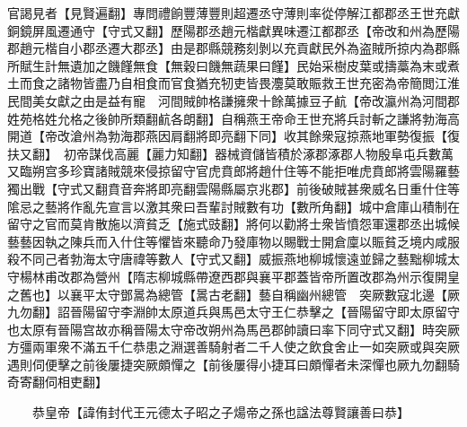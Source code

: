 官謁見者【見賢遍翻】專問禮餉豐薄豐則超遷丞守薄則率從停解江都郡丞王世充獻銅鏡屏風遷通守【守式又翻】歷陽郡丞趙元楷獻異味遷江都郡丞【帝改和州為歷陽郡趙元楷自小郡丞遷大郡丞】由是郡縣競務刻剝以充貢獻民外為盗賊所掠内為郡縣所賦生計無遺加之饑饉無食【無穀曰饑無蔬果曰饉】民始采樹皮葉或擣藁為末或煮土而食之諸物皆盡乃自相食而官食猶充牣吏皆畏灋莫敢賑救王世充密為帝簡閲江淮民間美女獻之由是益有寵　河間賊帥格謙擁衆十餘萬據豆子䴚【帝改瀛州為河間郡姓苑格姓允格之後帥所類翻䴚各朗翻】自稱燕王帝命王世充將兵討斬之謙將勃海高開道【帝改滄州為勃海郡燕因肩翻將即亮翻下同】收其餘衆寇掠燕地軍勢復振【復扶又翻】　初帝謀伐高麗【麗力知翻】器械資儲皆積於涿郡涿郡人物殷阜屯兵數萬又臨朔宫多珍寶諸賊競來侵掠留守官虎賁郎將趙什住等不能拒唯虎賁郎將雲陽羅藝獨出戰【守式又翻賁音奔將即亮翻雲陽縣屬京兆郡】前後破賊甚衆威名日重什住等隂忌之藝將作亂先宣言以激其衆曰吾輩討賊數有功【數所角翻】城中倉庫山積制在留守之官而莫肯散施以濟貧乏【施式豉翻】將何以勸將士衆皆憤怨軍還郡丞出城候藝藝因執之陳兵而入什住等懼皆來聽命乃發庫物以賜戰士開倉廩以賑貧乏境内咸服殺不同己者勃海太守唐禕等數人【守式又翻】威振燕地柳城懷遠並歸之藝黜柳城太守楊林甫改郡為營州【隋志柳城縣帶遼西郡與襄平郡蓋皆帝所置改郡為州示復開皇之舊也】以襄平太守鄧暠為總管【暠古老翻】藝自稱幽州總管　突厥數寇北邊【厥九勿翻】詔晉陽留守李淵帥太原道兵與馬邑太守王仁恭擊之【晉陽留守即太原留守也太原有晉陽宫故亦稱晉陽太守帝改朔州為馬邑郡帥讀曰率下同守式又翻】時突厥方彊兩軍衆不滿五千仁恭患之淵選善騎射者二千人使之飲食舍止一如突厥或與突厥遇則伺便擊之前後屢捷突厥頗憚之【前後屢得小捷耳曰頗憚者未深憚也厥九勿翻騎奇寄翻伺相吏翻】

　　恭皇帝【諱侑封代王元德太子昭之子煬帝之孫也諡法尊賢讓善曰恭】

